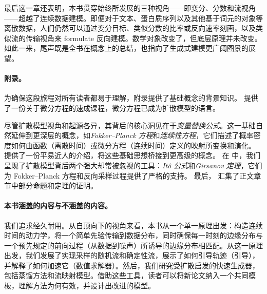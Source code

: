 最后这一章还表明，本书贯穿始终所发展的三种视角——即变分、分数和流视角——超越了连续数据建模。即便对于文本、蛋白质序列以及其他基于词元的对象等离散数据，人们仍然可以通过变分目标、类似分数的比率或反向速率刻画，以及类似流的传输视角来 formulate 反向建模。数学对象改变了，但底层原理并未改变。如此一来，尾声既是全书在概念上的总结，也指向了生成式建模更广阔图景的展望。


\paragraph{附录。}
为确保这段旅程对所有读者都易于理解，附录提供了基础概念的背景知识。 提供了一份关于微分方程的速成课程，微分方程已成为扩散模型的语言。

尽管扩散模型视角和起源各异，其背后的核心洞见在于\emph{变量替换公式}。这一基础自然延伸到更深层的概念，如\emph{Fokker--Planck 方程}和\emph{连续性方程}，它们描述了概率密度如何由函数（离散时间）或微分方程（连续时间）定义的映射所变换和演化。
 提供了一份平易近人的介绍，将这些基础思想桥接到更高级的概念。
在 中，我们呈现了扩散模型背后两个强大却常被忽视的工具：\emph{Itô 公式}和\emph{Girsanov 定理}，它们为 Fokker--Planck 方程和反向采样过程提供了严格的支持。
最后， 汇集了正文章节中部分命题和定理的证明。






\paragraph{本书涵盖的内容与不涵盖的内容。}
我们追求经久耐用。从自顶向下的视角来看，本书从一个单一原理出发：构造连续时间的动力学，将一个简单先验传输到数据分布，同时确保每一时刻的边缘分布与一个预先规定的前向过程（从数据到噪声）所诱导的边缘分布相匹配。从这一原理出发，我们发展了实现采样的随机流和确定性流，展示了如何引导轨迹（引导），并解释了如何加速它（数值求解器）。然后，我们研究受扩散启发的快速生成器，包括蒸馏方法和流映射模型。借助这些工具，读者可以将新论文纳入一个共同模板，理解方法为何有效，并设计出改进的模型。


